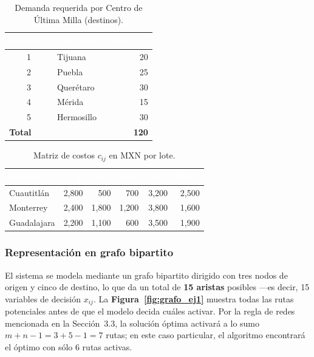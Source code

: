 \documentclass[10pt,letterpaper,twocolumn]{article}
\begin{document}
\begin{table}[!h]
\caption{Demanda requerida por Centro de Última Milla (destinos).}
\centering
\small
\begin{tabular}{c l r}
\arrayrulecolor{infotec}\toprule
\rowcolor{infotec}\textcolor{white}{\textbf{Destino $j$}} & \textcolor{white}{\textbf{Ubicación}} & \textcolor{white}{\textbf{Lotes ($b_j$)}} \\
\midrule
1 & Tijuana & 20 \\
2 & Puebla & 25 \\
3 & Querétaro & 30 \\
4 & Mérida & 15 \\
5 & Hermosillo & 30 \\
\midrule
\multicolumn{2}{l}{\textbf{Total}} & \textbf{120} \\
\bottomrule
\end{tabular}
\end{table}

\begin{table}[!h]
\caption{Matriz de costos $c_{ij}$ en MXN por lote.}
\centering
\footnotesize
\begin{tabular}{l r r r r r}
\arrayrulecolor{infotec}\toprule
\rowcolor{infotec}\textcolor{white}{\textbf{Origen}} & \textcolor{white}{\textbf{Tij.}} & \textcolor{white}{\textbf{Pue.}} & \textcolor{white}{\textbf{Qro.}} & \textcolor{white}{\textbf{Mér.}} & \textcolor{white}{\textbf{Hmo.}} \\
\midrule
Cuautitlán  & 2,800 & 500   & 700   & 3,200 & 2,500 \\
Monterrey   & 2,400 & 1,800 & 1,200 & 3,800 & 1,600 \\
Guadalajara & 2,200 & 1,100 & 600   & 3,500 & 1,900 \\
\bottomrule
\end{tabular}
\end{table}

\subsubsection{Representación en grafo bipartito}
El sistema se modela mediante un grafo bipartito dirigido con tres nodos de origen y cinco de destino, lo que da un total de \textbf{15 aristas} posibles ---es decir, 15 variables de decisión $x_{ij}$. La \textbf{Figura~\ref{fig:grafo_ej1}} muestra todas las rutas potenciales antes de que el modelo decida cuáles activar. Por la regla de redes mencionada en la Sección~3.3, la solución óptima activará a lo sumo $m+n-1 = 3+5-1 = 7$ rutas; en este caso particular, el algoritmo encontrará el óptimo con sólo 6 rutas activas.
\end{document}
